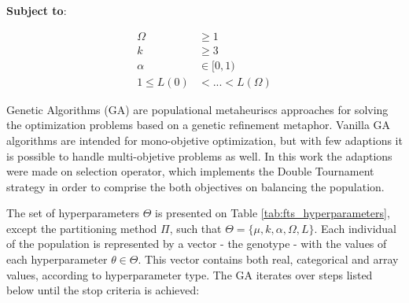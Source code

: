 \textbf{Subject to}:

\begin{align}
\Omega &\geq 1  \label{eqn:hyperopt_order}\\
k &\geq 3  \label{eqn:hyperopt_num_partitions}\\
\alpha &\in [0,1)  \label{eqn:hyperopt_alpha_cut}\\
1 \leq L(0) & < ... < L(\Omega)  \label{eqn:hyperopt_lag_inc}
\end{align}

Genetic Algorithms (GA) are populational metaheuriscs approaches for solving the optimization problems based on a genetic refinement metaphor. Vanilla GA algorithms are intended for mono-objetive optimization, but with few adaptions it is possible to handle multi-objetive problems as well. In this work the adaptions were made on selection operator, which implements the Double Tournament strategy in order to comprise the both objectives on balancing the population.

The set of hyperparameters $\Theta$ is presented on Table \ref{tab:fts_hyperparameters}, except the partitioning method $\Pi$, such that $\Theta = \{\mu,k,\alpha,\Omega,L\}$. Each individual of the population is represented by a vector - the genotype - with the values of each hyperparameter $\theta \in \Theta$. This vector contains both real, categorical and array values, according to hyperparameter type. The GA iterates over steps listed below until the stop criteria is achieved:

